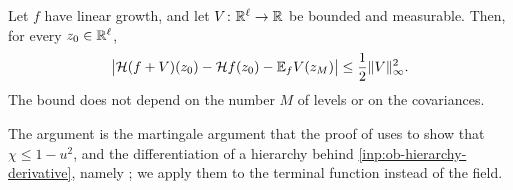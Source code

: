 \begin{lemma}\label{b:lem:os-prefix}
Let $f$ have linear growth, and let $V\colon\mathbb R^\ell\to\mathbb R$ be bounded and
measurable. Then, for every $z_0\in\mathbb R^\ell$,
\[
 \bigl\lvert\mathcal H(f+V)(z_0)-\mathcal Hf(z_0)-\mathbb E_f V(z_M)\bigr\rvert
 \le\frac12\lVert V\rVert_\infty^2.
\]
The bound does not depend on the number $M$ of levels or on the covariances.
\end{lemma}

The argument is the martingale argument that the proof of
\cite[Lemma~3.1]{oai-barriers} uses to show that $\chi\le1-u^2$, and the
differentiation of a hierarchy behind \cref{inp:ob-hierarchy-derivative}, namely
\cite[Lemma~2.2]{oai-barriers}; we apply them to the terminal function instead
of the field.

